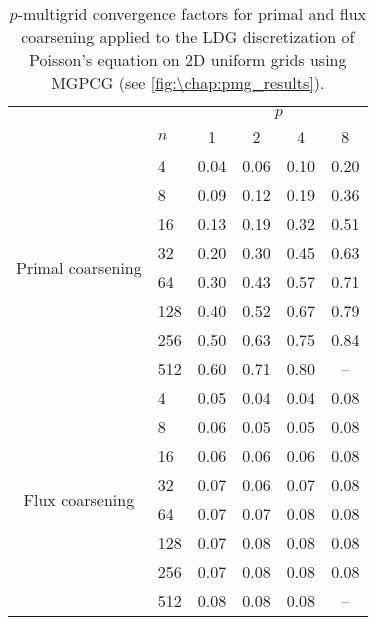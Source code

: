 \begin{table}[htb]
\caption{$p$-multigrid convergence factors for primal and flux coarsening applied to the LDG discretization of Poisson's equation on 2D uniform grids using MGPCG (see \cref{fig:\chap:pmg_results}).\vspace{-1.8em}}
\label{tab:2D_pmg}
\centering
\small
\begin{tabular}{@{}cl@{\qquad}cccc@{}}
&&&&& \\ \midrule
&& \multicolumn{4}{c}{$p$} \\
& $n$ & 1 & 2 & 4 & 8 \\ \cmidrule{1-6}
\multirow{8}{*}{Primal coarsening}
& 4 & 0.04 & 0.06 & 0.10 & 0.20 \\ 
& 8 & 0.09 & 0.12 & 0.19 & 0.36 \\ 
& 16 & 0.13 & 0.19 & 0.32 & 0.51 \\ 
& 32 & 0.20 & 0.30 & 0.45 & 0.63 \\ 
& 64 & 0.30 & 0.43 & 0.57 & 0.71 \\ 
& 128 & 0.40 & 0.52 & 0.67 & 0.79 \\ 
& 256 & 0.50 & 0.63 & 0.75 & 0.84 \\ 
& 512 & 0.60 & 0.71 & 0.80 &  --  \\ \cmidrule{1-6}
\multirow{8}{*}{Flux coarsening}
& 4 & 0.05 & 0.04 & 0.04 & 0.08 \\ 
& 8 & 0.06 & 0.05 & 0.05 & 0.08 \\ 
& 16 & 0.06 & 0.06 & 0.06 & 0.08 \\ 
& 32 & 0.07 & 0.06 & 0.07 & 0.08 \\ 
& 64 & 0.07 & 0.07 & 0.08 & 0.08 \\ 
& 128 & 0.07 & 0.08 & 0.08 & 0.08 \\ 
& 256 & 0.07 & 0.08 & 0.08 & 0.08 \\ 
& 512 & 0.08 & 0.08 & 0.08 &  --  \\ \midrule
\end{tabular}
\end{table}


